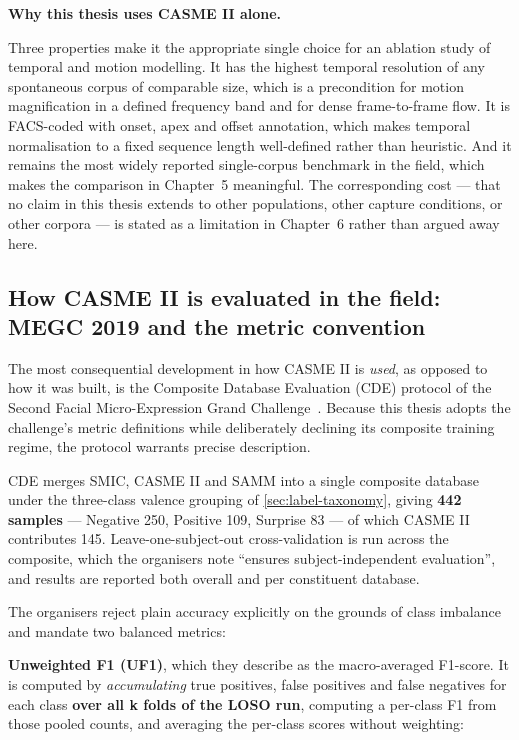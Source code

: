 \textbf{Why this thesis uses CASME II alone.}

Three properties make it the appropriate single choice for an ablation study of temporal and motion modelling. It has the highest temporal resolution of any spontaneous corpus of comparable size, which is a precondition for motion magnification in a defined frequency band and for dense frame-to-frame flow. It is FACS-coded with onset, apex and offset annotation, which makes temporal normalisation to a fixed sequence length well-defined rather than heuristic. And it remains the most widely reported single-corpus benchmark in the field, which makes the comparison in Chapter~5 meaningful. The corresponding cost --- that no claim in this thesis extends to other populations, other capture conditions, or other corpora --- is stated as a limitation in Chapter~6 rather than argued away here.


\subsection{How CASME II is evaluated in the field: MEGC 2019 and the metric convention}
\label{sec:megc-metrics}

The most consequential development in how CASME II is \textit{used}, as opposed to how it was built, is the Composite Database Evaluation (CDE) protocol of the Second Facial Micro-Expression Grand Challenge~\cite{see2019}. Because this thesis adopts the challenge's metric definitions while deliberately declining its composite training regime, the protocol warrants precise description.

CDE merges SMIC, CASME II and SAMM into a single composite database under the three-class valence grouping of \autoref{sec:label-taxonomy}, giving \textbf{442 samples} --- Negative 250, Positive 109, Surprise 83 --- of which CASME II contributes 145. Leave-one-subject-out cross-validation is run across the composite, which the organisers note ``ensures subject-independent evaluation'', and results are reported both overall and per constituent database.

The organisers reject plain accuracy explicitly on the grounds of class imbalance and mandate two balanced metrics:

\textbf{Unweighted F1 (UF1)}, which they describe as the macro-averaged F1-score. It is computed by \textit{accumulating} true positives, false positives and false negatives for each class \textbf{over all k folds of the LOSO run}, computing a per-class F1 from those pooled counts, and averaging the per-class scores without weighting:

